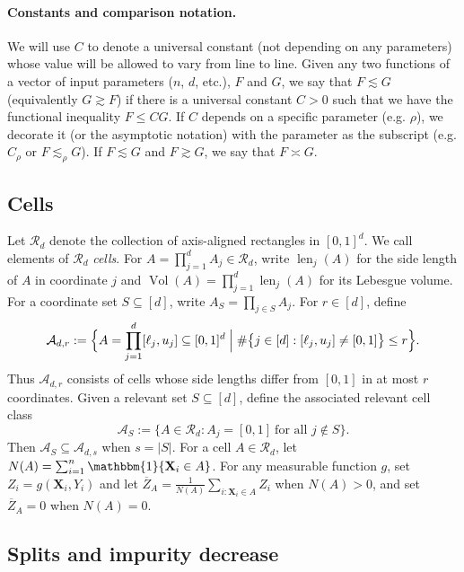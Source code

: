 \documentclass[11pt]{article}
\theoremstyle{plain}
\theoremstyle{definition}
\theoremstyle{remark}
\theoremstyle{plain}
\newcommand{\bX}{\mathbf{X}}
\DeclareMathOperator{\Vol}{Vol}
\DeclareMathOperator{\len}{len}
\newcommand{\1}{\mathbbm{1}}
\begin{document}
\paragraph{Constants and comparison notation.}
We will use $C$ to denote a universal constant (not depending on any parameters) whose value will be allowed to vary from line to line.
Given any two functions of a vector of input parameters ($n$, $d$, etc.), $F$ and $G$, we say that $F \lesssim G$ (equivalently $G \gtrsim F$) if there is a universal constant $C > 0$ such that we have the functional inequality $F \leq CG$.
If $C$ depends on a specific parameter (e.g. $\rho$), we decorate it (or the asymptotic notation) with the parameter as the subscript (e.g. $C_\rho$ or $F \lesssim_\rho G$).
If $F \lesssim G$ and $F \gtrsim G$, we say that $F \asymp G$.

\subsection{Cells}
\label{sec:impurity-decrease}

Let $\mathcal R_d$ denote the collection of axis-aligned rectangles in $[0,1]^d$. We call elements of $\mathcal R_d$ \emph{cells}. For $A=\prod_{j=1}^d A_j\in\mathcal R_d$, write $\len_j(A)$ for the side length of $A$ in coordinate $j$ and $\Vol(A)=\prod_{j=1}^d \len_j(A)$ for its Lebesgue volume. For a coordinate set $S\subseteq[d]$, write $A_S=\prod_{j\in S}A_j$.
For $r\in[d]$, define
\begin{equation}\label{eq:Apd}
    \mathcal{A}_{d,r}
    :=
    \Bigl\{
    A=\prod_{j=1}^d [\ell_j,u_j]\subseteq [0,1]^d
    \;\Big|\;
    \#\bigl\{j\in[d]:[\ell_j,u_j]\neq[0,1]\bigr\}\le r
    \Bigr\}.
\end{equation}
Thus $\mathcal{A}_{d,r}$ consists of cells whose side lengths differ from $[0,1]$ in at most $r$ coordinates. Given a relevant set $S\subseteq[d]$, define the associated relevant cell class
\[
\mathcal A_S
:=
\{A\in\mathcal R_d:A_j=[0,1]\ \text{for all }j\notin S\}.
\]
Then $\mathcal A_S\subseteq\mathcal A_{d,s}$ when $s=|S|$.
For a cell $A\in\mathcal R_d$, let $N(A)=\sum_{i=1}^n\1\{\bX_i\in A\}$. For any measurable function $g$, set $Z_i=g(\bX_i,Y_i)$ and let $\overline Z_A
=
\frac{1}{N(A)}
\sum_{i:\bX_i\in A} Z_i$
when $N(A)>0$, and set $\overline Z_A=0$ when $N(A)=0$.

\subsection{Splits and impurity decrease}
\end{document}
